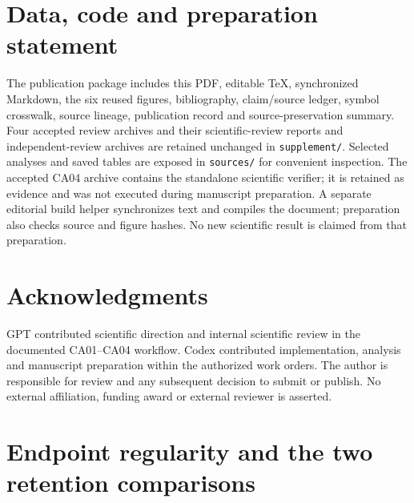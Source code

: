 \documentclass[11pt,a4paper]{article}
\numberwithin{equation}{section}
\begin{document}
\section*{Data, code and preparation statement}
The publication package includes this PDF, editable TeX, synchronized Markdown, the six reused figures, bibliography, claim/source ledger, symbol crosswalk, source lineage, publication record and source-preservation summary. Four accepted review archives and their scientific-review reports and independent-review archives are retained unchanged in \texttt{supplement/}. Selected analyses and saved tables are exposed in \texttt{sources/} for convenient inspection. The accepted CA04 archive contains the standalone scientific verifier; it is retained as evidence and was not executed during manuscript preparation. A separate editorial build helper synchronizes text and compiles the document; preparation also checks source and figure hashes. No new scientific result is claimed from that preparation.

\section*{Acknowledgments}
GPT contributed scientific direction and internal scientific review in the documented CA01--CA04 workflow. Codex contributed implementation, analysis and manuscript preparation within the authorized work orders. The author is responsible for review and any subsequent decision to submit or publish. No external affiliation, funding award or external reviewer is asserted.

\appendix
\section{Endpoint regularity and the two retention comparisons}\label{app:regularity}
\end{document}
